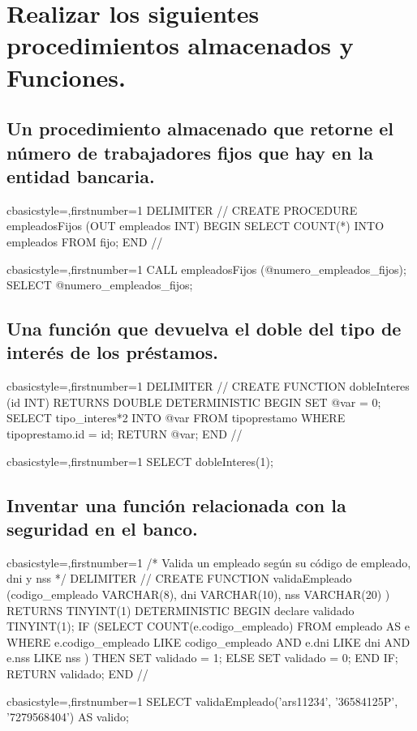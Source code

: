 \section{Realizar los siguientes procedimientos almacenados y Funciones.}
	\subsection{Un procedimiento almacenado que retorne el número de trabajadores fijos que hay en la entidad bancaria.}
		\begin{sourcecodep}[]{c}{basicstyle={\fontsize{10}{10}\selectfont\ttfamily},firstnumber=1}{}
			DELIMITER //
			CREATE PROCEDURE empleadosFijos (OUT empleados INT)
			BEGIN
				SELECT COUNT(*) INTO empleados FROM fijo;
			END
			//\end{sourcecodep}
		\begin{sourcecodep}[]{c}{basicstyle={\fontsize{10}{10}\selectfont\ttfamily},firstnumber=1}{}
			CALL empleadosFijos (@numero_empleados_fijos);
			SELECT @numero_empleados_fijos;\end{sourcecodep}
	\subsection{Una función que devuelva el doble del tipo de interés de los préstamos.}
		\begin{sourcecodep}[]{c}{basicstyle={\fontsize{10}{10}\selectfont\ttfamily},firstnumber=1}{}
			DELIMITER //
			CREATE FUNCTION dobleInteres (id INT) RETURNS DOUBLE DETERMINISTIC
			BEGIN 
				SET @var = 0;
				SELECT tipo_interes*2 INTO @var FROM tipoprestamo WHERE tipoprestamo.id = id;
				RETURN @var;
			END
			//\end{sourcecodep}
		\begin{sourcecodep}[]{c}{basicstyle={\fontsize{10}{10}\selectfont\ttfamily},firstnumber=1}{}
			SELECT dobleInteres(1);\end{sourcecodep}
	\subsection{Inventar una función relacionada con la seguridad en el banco.}
		\begin{sourcecodep}[]{c}{basicstyle={\fontsize{10}{10}\selectfont\ttfamily},firstnumber=1}{}
			/* Valida un empleado según su código de empleado, dni y nss */
			DELIMITER //
			CREATE FUNCTION validaEmpleado (codigo_empleado VARCHAR(8), dni VARCHAR(10), nss VARCHAR(20) ) RETURNS TINYINT(1) DETERMINISTIC
			BEGIN
				declare validado TINYINT(1);
				IF (SELECT COUNT(e.codigo_empleado) FROM empleado AS e WHERE e.codigo_empleado LIKE codigo_empleado AND e.dni LIKE dni AND e.nss LIKE nss ) THEN
					SET validado = 1;
				ELSE
					SET validado = 0;
				END IF;
				RETURN validado;
			END
			//\end{sourcecodep}
		\begin{sourcecodep}[]{c}{basicstyle={\fontsize{10}{10}\selectfont\ttfamily},firstnumber=1}{}
			SELECT validaEmpleado('ars11234', '36584125P', '7279568404') AS valido;\end{sourcecodep}

